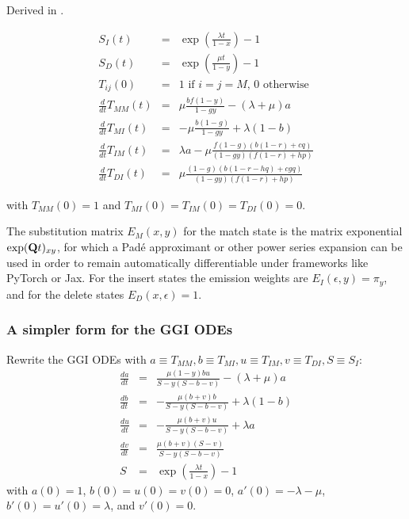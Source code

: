 \documentclass{article}
\begin{document}
Derived in \cite{Holmes2020}.

\begin{eqnarray*}
S_I(t) & = & \exp\left(\frac{\lambda t}{1-x}\right)-1 \\
S_D(t) & = & \exp\left(\frac{\mu t}{1-y}\right)-1 \\
 T_{ij}(0) & = & \mbox{1 if $i=j=M$, 0 otherwise}
\\
  \frac{d}{dt} T_{MM}(t) & = &
  \mu \frac{b f (1-y)}{1 - g y}-(\lambda +\mu )a
  \nonumber \\
  \frac{d}{dt} T_{MI}(t) & = &
  -\mu \frac{b (1-g)}{1 - g y} + \lambda (1-b)
  \nonumber \\
  \frac{d}{dt} T_{IM}(t) & = &
  \lambda a - \mu \frac{f (1-g) (b (1-r)+c q)}{(1 - g y) (f (1-r)+h p)}
  \nonumber \\
  \frac{d}{dt} T_{DI}(t) & = &
  \mu \frac{(1-g) (b (1-r-h q)+c g q)}{(1-g y) (f (1-r)+h p)}
\end{eqnarray*}

with $T_{MM}(0)=1$ and $T_{MI}(0)=T_{IM}(0)=T_{DI}(0)=0$.

The substitution matrix $E_M(x,y)$ for the match state is
the matrix exponential $\exp({\bf Q}t)_{xy}$, for which a Pad\'{e} approximant
or other power series expansion can be used in order to remain automatically differentiable under frameworks like PyTorch or Jax. %
For the insert states the emission weights are $E_I(\epsilon,y)=\pi_y$,
and for the delete states $E_D(x,\epsilon)=1$.

\subsubsection{A simpler form for the GGI ODEs}

Rewrite the GGI ODEs with $a \equiv T_{MM}, b \equiv T_{MI}, u \equiv T_{IM}, v \equiv T_{DI}, S \equiv S_I$:
\begin{eqnarray*}
  \frac{da}{dt} & = & \frac{\mu (1-y) b u}{S - y(S-b-v)} - (\lambda +\mu ) a \\
  \frac{db}{dt} & = & -\frac{\mu (b+v) b}{S - y(S-b-v)} + \lambda (1-b) \\
  \frac{du}{dt} & = & -\frac{\mu (b+v) u}{S - y(S-b-v)} + \lambda a \\
  \frac{dv}{dt} & = & \frac{\mu (b+v) (S-v)}{S - y(S-b-v)} \\
  S & = & \exp\left(\frac{\lambda t}{1-x}\right)-1
\end{eqnarray*}
with $a(0)=1$, $b(0)=u(0)=v(0)=0$,
$a'(0)=-\lambda-\mu$, $b'(0)=u'(0)=\lambda$, and $v'(0)=0$.
\end{document}
